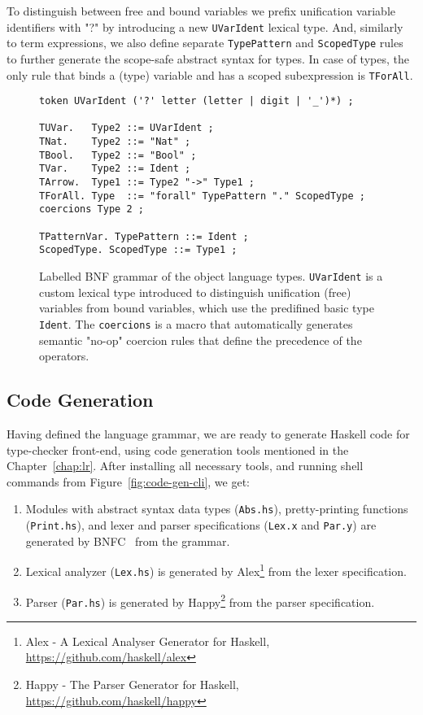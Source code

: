 To distinguish between free and bound variables we prefix unification variable identifiers with "?" by introducing a new \texttt{UVarIdent} lexical type. And, similarly to term expressions, we also define separate \texttt{TypePattern} and \texttt{ScopedType} rules to further generate the scope-safe abstract syntax for types. In case of types, the only rule that binds a (type) variable and has a scoped subexpression is \texttt{TForAll}.

\begin{figure}[H]
  \begin{verbatim}
token UVarIdent ('?' letter (letter | digit | '_')*) ;

TUVar.   Type2 ::= UVarIdent ;
TNat.    Type2 ::= "Nat" ;
TBool.   Type2 ::= "Bool" ;
TVar.    Type2 ::= Ident ;
TArrow.  Type1 ::= Type2 "->" Type1 ;
TForAll. Type  ::= "forall" TypePattern "." ScopedType ;
coercions Type 2 ;

TPatternVar. TypePattern ::= Ident ;
ScopedType. ScopedType ::= Type1 ;
\end{verbatim}
  \caption[LBNF grammar of the object language types]{Labelled BNF grammar of the object language types. \texttt{UVarIdent} is a custom lexical type introduced to distinguish unification (free) variables from bound variables, which use the predifined basic type \texttt{Ident}. The \texttt{coercions} is a macro that automatically generates semantic "no-op" coercion rules that define the precedence of the operators.}
  \label{fig:lbnf-types}
\end{figure}


\subsection{Code Generation}

Having defined the language grammar, we are ready to generate Haskell code for type-checker front-end, using code generation tools mentioned in the Chapter~\ref{chap:lr}. After installing all necessary tools, and running shell commands from Figure~\ref{fig:code-gen-cli}, we get:

\begin{enumerate}
  \item Modules with abstract syntax data types (\texttt{Abs.hs}), pretty-printing functions (\texttt{Print.hs}), and lexer and parser specifications (\texttt{Lex.x} and \texttt{Par.y}) are generated by BNFC~\cite{BNFC} from the grammar.
  \item Lexical analyzer (\texttt{Lex.hs}) is generated by Alex\footnote{Alex - A Lexical Analyser Generator for Haskell, \url{https://github.com/haskell/alex}} from the lexer specification.
  \item Parser (\texttt{Par.hs}) is generated by Happy\footnote{Happy - The Parser Generator for Haskell, \url{https://github.com/haskell/happy}} from the parser specification.
\end{enumerate}

